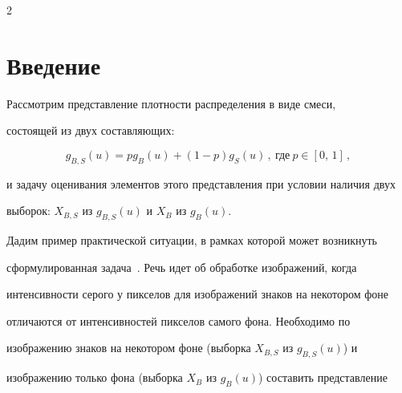       







      \thispagestyle{headings}





      \begin{multicols}{2}





      \label{st\stat}





      


\section{ Введение}


     


     Рассмотрим представление плотности распределения в виде смеси, 


состоящей из двух составляющих:


     \begin{equation}


    g_{B,S} (u) = pg_B (u) +(1-p)g_S (u)\,,\ \mbox{где}\ p\in [0,\,1]\,,


     \label{e1kr}


     \end{equation}


и задачу оценивания элементов этого представления при условии наличия двух 


выборок: $X_{B,S}$ из  $g_{B,S}(u)$ и $X_B$ из $g_B(u)$.


     


     Дадим пример практической ситуации, в рамках которой может возникнуть 


сформулированная задача~\cite{1kr}. Речь идет об обработке изображений, когда 


интенсивности серого у пикселов для изоб\-ра\-же\-ний знаков на некотором фоне 


отличаются от интенсивностей пикселов самого фона. Необходимо по 


изображению знаков на некотором фоне (выборка $X_{B,S}$ из $g_{B,S}(u)$) и 


изображению только фона (выборка $X_B$ из $g_B(u)$) составить представление 



\end{multicols}
